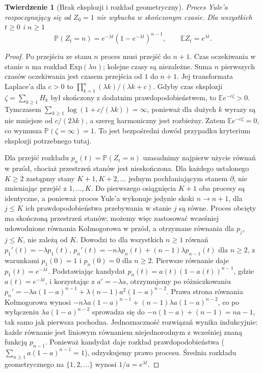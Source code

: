 \documentclass[11pt,a4paper,oneside]{report}
\numberwithin{equation}{chapter}
\theoremstyle{plain}
\newtheorem{twierdzenie}{Twierdzenie}[chapter]
\theoremstyle{definition}
\theoremstyle{remark}
\newcommand{\Prob}{\mathbb{P}}
\newcommand{\E}{\mathbb{E}}
\begin{document}
\begin{twierdzenie}[Brak eksplozji i rozkład geometryczny]
Proces Yule'a rozpoczynający się od $Z_0=1$ nie wybucha
w skończonym czasie. Dla wszystkich $t\ge0$ i $n\ge1$
\[
\Prob(Z_t=n)=e^{-\lambda t}(1-e^{-\lambda t})^{n-1},
\qquad \E Z_t=e^{\lambda t}.
\]
\end{twierdzenie}
\begin{proof}
Po przejściu ze stanu $n$ proces musi przejść do $n+1$.
Czas oczekiwania w stanie $n$ ma rozkład
$\mathrm{Exp}(\lambda n)$; kolejne czasy są niezależne.
Suma $n$ pierwszych czasów oczekiwania jest czasem przejścia
od $1$ do $n+1$. Jej transformata Laplace'a dla $c>0$ to
$\prod_{k=1}^n (\lambda k)/(\lambda k+c)$.
Gdyby czas eksplozji $\zeta=\sum_{k\ge1}H_k$ był
skończony z dodatnim prawdopodobieństwem, to
$\E e^{-c\zeta}>0$. Tymczasem
$\sum_{k\ge1}\log(1+c/(\lambda k))=\infty$,
ponieważ dla dużych $k$ wyrazy są nie mniejsze od
$c/(2\lambda k)$, a szereg harmoniczny jest rozbieżny.
Zatem $\E e^{-c\zeta}=0$, co wymusza
$\Prob(\zeta=\infty)=1$. To jest bezpośredni dowód
przypadku kryterium eksplozji potrzebnego tutaj.

Dla przejść rozkładu $p_n(t)=\Prob(Z_t=n)$
uzasadnimy najpierw użycie równań w przód, chociaż przestrzeń
stanów jest nieskończona. Dla każdego ustalonego $K\ge2$
zastąpmy stany $K+1,K+2,\ldots$ jednym pochłaniającym
stanem $\partial$, nie zmieniając przejść z $1,\ldots,K$.
Do pierwszego osiągnięcia $K+1$ oba procesy są identyczne,
a ponieważ proces Yule'a wykonuje jedynie skoki $n\to n+1$,
dla $j\le K$ ich prawdopodobieństwa przebywania w stanie $j$
są równe. Proces obcięty ma skończoną przestrzeń stanów;
możemy więc zastosować wcześniej udowodnione równania
Kołmogorowa w przód, a otrzymane równania dla $p_j$, $j\le K$,
nie zależą od $K$. Dowodzi to dla wszystkich $n\ge1$ równań
$p_1'(t)=-\lambda p_1(t)$,
$p_n'(t)=-n\lambda p_n(t)+(n-1)\lambda p_{n-1}(t)$ dla $n\ge2$,
z warunkami $p_1(0)=1$ i $p_n(0)=0$ dla $n\ge2$.
Pierwsze równanie daje $p_1(t)=e^{-\lambda t}$.
Podstawiając kandydat
$p_n(t)=a(t)(1-a(t))^{n-1}$, gdzie $a(t)=e^{-\lambda t}$,
i korzystając z $a'=-\lambda a$, otrzymujemy po różniczkowaniu
$p_n'=-\lambda a(1-a)^{n-1}+\lambda(n-1)a^2(1-a)^{n-2}$.
Prawa strona równania Kołmogorowa wynosi
$-n\lambda a(1-a)^{n-1}+(n-1)\lambda a(1-a)^{n-2}$,
co po wyłączeniu $\lambda a(1-a)^{n-2}$ sprowadza się do
$-n(1-a)+(n-1)=na-1$,
tak samo jak pierwsza pochodna.
Jednoznaczność rozwiązań wynika indukcyjnie: każde równanie
jest liniowym równaniem niejednorodnym z wcześniej znaną
funkcją $p_{n-1}$. Ponieważ kandydat daje rozkład
prawdopodobieństwa ($\sum_{n\ge1}a(1-a)^{n-1}=1$),
odzyskujemy prawo procesu. Średnia rozkładu
geometrycznego na $\{1,2,\ldots\}$ wynosi $1/a=e^{\lambda t}$.
\end{proof}
\end{document}
